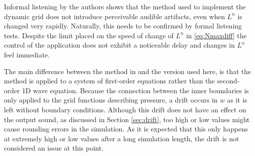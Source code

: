Informal listening by the authors shows that the method used to implement the dynamic grid does not introduce perceivable audible artifacts, even when $L^n$ is changed very rapidly. Naturally, this needs to be confirmed by formal listening tests. Despite the limit placed on the speed of change of $L^n$ in \eqref{eq:Nmaxdiff} the control of the application does not exhibit a noticeable delay and changes in $L^n$ feel immediate.

The main difference between the method in \cite{Willemsen2021} and the version used here, is that the method is applied to a system of first-order equations rather than the second-order 1D wave equation. Because the connection between the inner boundaries is only applied to the grid functions describing pressure, a drift occurs in $w$ as it is left without boundary conditions. Although this drift does not have an effect on the output sound, as discussed in Section \ref{sec:drift}, too high or low values might cause rounding errors in the simulation. As it is expected that this only happens at extremely high or low values after a long simulation length, the drift is not considered an issue at this point. 



